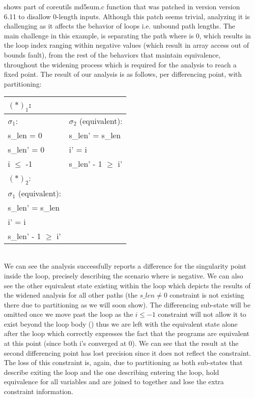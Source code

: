  shows part of coreutils md5sum.c  function that was patched in version version 6.11 to disallow 0-length inputs. Although this patch seems trivial, analyzing it is challenging as it affects the behavior of loops i.e. unbound path lengths. The main challenge in this example, is separating the path where  is 0, which results in the loop index  ranging within negative values (which result in array access out of bounds fault), from the rest of the behaviors that maintain equivalence, throughout the widening process which is required for the analysis to reach a fixed point. The result of our analysis is as follows, per differencing point, with partitioning:
\\
\begin{tabular}{l|l}
$(*)_1$:
\\ \hline
$\sigma_1$:     & $\sigma_2$ (equivalent):
\\ \hline
s\_len = 0      & s\_len' = s\_len
\\
s\_len' = 0     & i' = i
\\
i $\leq$ -1     & s\_len' - 1 $\geq$ i'
\\ \hline
$(*)_2$:
\\ \hline
$\sigma_1$ (equivalent):
\\ \hline
s\_len' = s\_len
\\
i' = i
\\
s\_len' - 1 $\geq$ i'
\\ \hline
\end{tabular}
\\
We can see the analysis successfully reports a difference for the singularity point  inside the loop, precisely describing the scenario where  is negative. We can also see the other equivalent state existing within the loop which depicts the results of the widened analysis for all other paths (the $s\_len \neq 0$ constraint is not existing there due to partitioning as we will soon show). The differencing sub-state will be omitted once we move past the loop as the $i \leq -1$ constraint will not allow it to exist beyond the loop body () thus we are left with the equivalent state alone after the loop which correctly expresses the fact that the programs are equivalent at this point (since both i's converged at 0). We can see that the result at the second differencing point has lost precision since it does not reflect the  constraint. The loss of this constraint is, again, due to partitioning as both sub-states that describe exiting the loop and the one describing entering the loop, hold equivalence for all variables and are joined to together and lose the extra constraint information.
